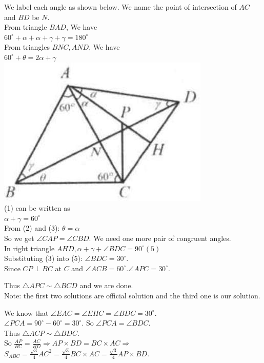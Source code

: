 \documentclass[10pt]{article}
\begin{document}
We label each angle as shown below. We name the point of intersection of \(A C\) and \(B D\) be \(N\).\\
From triangle \(B A D\), We have\\
\(60^{\circ}+\alpha+\alpha+\gamma+\gamma=180^{\circ}\)\\
From triangles \(B N C, A N D\), We have\\
\(60^{\circ}+\theta=2 \alpha+\gamma\)\\
\includegraphics[max width=\textwidth, center]{2025_04_17_97bc1f7e44d93c271a88g-199}\\
(1) can be written as\\
\(\alpha+\gamma=60^{\circ}\)\\
From (2) and (3): \(\theta=\alpha\)\\
So we get \(\angle C A P=\angle C B D\). We need one more pair of congruent angles.\\
In right triangle \(A H D, \alpha+\gamma+\angle B D C=90^{\circ}(5)\)\\
Substituting (3) into (5): \(\angle B D C=30^{\circ}\).\\
Since \(C P \perp B C\) at \(C\) and \(\angle A C B=60^{\circ} . \angle A P C=30^{\circ}\).

Thus \(\triangle A P C \sim \triangle B C D\) and we are done.\\
Note: the first two solutions are official solution and the third one is our solution.


We know that \(\angle E A C=\angle E H C=\angle B D C=30^{\circ}\).\\
\(\angle P C A=90^{\circ}-60^{\circ}=30^{\circ}\). So \(\angle P C A=\angle B D C\).\\
Thus \(\triangle A C P \sim \triangle B D C\).\\
So \(\frac{A P}{B C}=\frac{A C}{B D} \Rightarrow A P \times B D=B C \times A C \Rightarrow\)\\
\(S_{A B C}=\frac{\sqrt{3}}{4} A C^{2}=\frac{\sqrt{3}}{4} B C \times A C=\frac{\sqrt{3}}{4} A P \times B D\).
\end{document}
